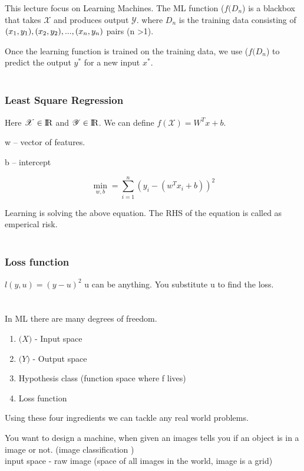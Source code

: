 \documentclass{article}
\begin{document}
\newpage
This lecture focus on Learning Machines.
The ML function (\( f(D_{n} \)) is a blackbox that takes  \(\mathcal{X}\) and produces output \(\mathcal{Y}\).
	where  \( D_{n} \) is the training data consisting of \((x_{1}, y_{1}),(x_{2}, y_{2}), ... ,(x_{n}, y_{n})\\ \) pairs (n \textgreater 1).

Once the learning function is trained on the training data, we use (\( f(D_{n} \)) to predict the output \( y^{*}\) for a new input \(x^{*}\).\\\\
\subsubsection*{Least Square Regression}

Here \( \mathcal{X}  \in \rm I\!R \)  and \( \mathcal{Y}  \in \rm I\!R \). We can define \( f(\mathcal{X}) = W^{T}x + b \).

w -- vector of features.

b -- intercept

\begin{equation}
\min_{w,b} =   \sum_{i=1}^{n}(y_{i} - (w^{T}x_{i} + b))^{2}
\end{equation}

Learning is solving the above equation. The RHS of the equation is called as emperical risk.\\\\
\subsubsection*{Loss function}

\(l(y, u) = (y - u)^{2} \)
u can be anything.  You substitute u to find the loss.\\\\\\
In ML there are many degrees of freedom.
\begin{enumerate}
	\item \( \mathcal(X) \) - Input space
	\item \( \mathcal(Y) \) - Output space
	\item Hypothesis class (function space where f lives)
	\item Loss function
\end{enumerate}
Using these four ingredients we can tackle any real world problems.

You want to design a machine, when given an images tells you if an object is in a image or not. (image classification )\\
input space - raw image (space of all images in the world, image is a grid)\\
\end{document}

